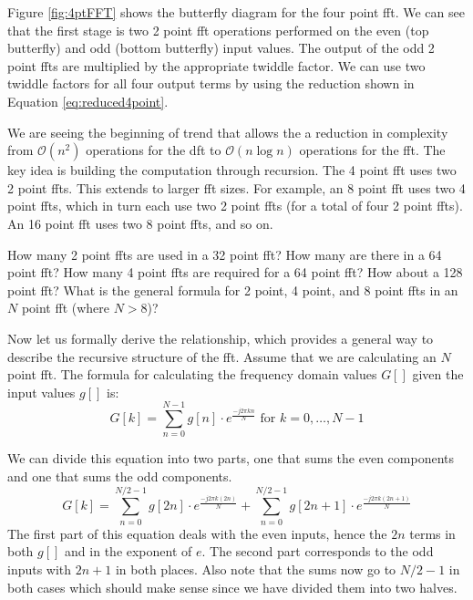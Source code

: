Figure \ref{fig:4ptFFT} shows the butterfly diagram for the four point \gls{fft}. We can see that the first stage is two 2 point \gls{fft} operations performed on the even (top butterfly) and odd (bottom butterfly) input values. The output of the odd 2 point \gls{fft}s are multiplied by the appropriate twiddle factor. We can use two twiddle factors for all four output terms by using the reduction shown in Equation \ref{eq:reduced4point}.

We are seeing the beginning of trend that allows the a reduction in complexity from $\mathcal{O}(n^2)$ operations for the \gls{dft} to $\mathcal{O}(n \log n)$ operations for the \gls{fft}. The key idea is building the computation through recursion. The 4 point \gls{fft} uses two 2 point \gls{fft}s. This extends to larger \gls{fft} sizes. For example, an 8 point \gls{fft} uses two 4 point \gls{fft}s, which in turn each use two 2 point \gls{fft}s (for a total of four 2 point \gls{fft}s). An 16 point \gls{fft} uses two 8 point \gls{fft}s, and so on.

\begin{exercise}
How many 2 point \gls{fft}s are used in a 32 point \gls{fft}? How many are there in a 64 point \gls{fft}? How many 4 point \gls{fft}s are required for a 64 point \gls{fft}? How about a 128 point \gls{fft}?  What is the general formula for 2 point, 4 point, and 8 point \gls{fft}s in an $N$ point \gls{fft} (where $N > 8$)?
\end{exercise}

Now let us formally derive the relationship, which provides a general way to describe the recursive structure of the \gls{fft}.  Assume that we are calculating an $N$ point \gls{fft}. The formula for calculating the frequency domain values $G[]$ given the input values $g[]$ is:
\begin{equation}
G[k] = \displaystyle\sum\limits_{n=0}^{N-1} g[n] \cdot e^{\frac{-j 2 \pi k n}{N}} \text{ for } k = 0,\dots, N-1
\label{eq:fft-full}
\end{equation}

We can divide this equation into two parts, one that sums the even components and one that sums the odd components.
\begin{equation}
G[k] = \displaystyle\sum\limits_{n=0}^{N/2-1} g[2n] \cdot e^{\frac{-j 2 \pi k (2n)}{N}} + \displaystyle\sum\limits_{n=0}^{N/2-1} g[2n+1] \cdot e^{\frac{-j 2 \pi k (2n+1)}{N}}
\label{eq:fft-split}
\end{equation}
The first part of this equation deals with the even inputs, hence the $2n$ terms in both $g[]$ and in the exponent of $e$. The second part corresponds to the odd inputs with $2n +1$ in both places. Also note that the sums now go to $N/2 -1$ in both cases which should make sense since we have divided them into two halves. 

